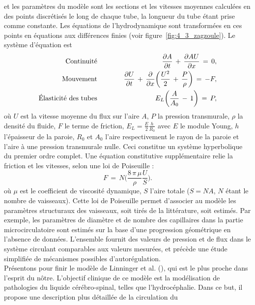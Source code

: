 et les paramètres du modèle sont les sections et les vitesses moyennes calculées en des points
discrétisés le long de chaque tube, la longueur du tube étant prise comme constante. Les équations de l'hydrodynamique sont transformées en ces points en équations aux différences finies (voir figure~\ref{fig:4_3_zagzoule}). Le système
d'équation est
\begin{eqnarray}
 \mbox{Continuité\hspace{1cm}}&&\frac{\partial A}{\partial t}\,+\,\frac{\partial A U}{\partial x}\,=\,0,\\
\mbox{Mouvement\hspace{1cm}}&&\frac{\partial U}{\partial t}\,+\,\frac{\partial}{\partial x} \biggl(\frac{U^2}{2}\,+\,\frac{P}{\rho}\biggr)\,=\,-F,\\
\mbox{\'Elasticité  des tubes\hspace{1cm}}&&E_L\biggl(\frac{A}{A_0}\,-\,1\biggr)\,=\,P,
\end{eqnarray}
où $U$ est la vitesse moyenne du flux sur l'aire $A$, $P$ la pression transmurale, $\rho$ la densité du fluide, $F$ le terme de friction, $E_L=\frac{E}{2}\frac{h}{R_0}$ avec $E$ le module Young, $h$ l'épaisseur de la paroie, $R_0$ et $A_0$ l'aire respectivement le rayon de la paroie et l'aire à une pression transmurale nulle.
 Ceci constitue un système hyperbolique du premier ordre complet. Une équation constitutive
supplémentaire relie la friction et les vitesses, selon une loi de Poiseuille :
\begin{equation}
\label{eq:poiseuille}
F\,=\,N\biggl(\frac{8\,\pi\,\mu}{\rho}\frac{U}{S}\biggr).
\end{equation}
où $\mu$ est le coefficient de viscosité dynamique, $S$ l'aire totale ($S = NA$, $N$ étant le nombre de vaisseaux). Cette loi de Poiseuille permet d'associer au modèle les paramètres structuraux des vaisseaux, soit tirés
de la littérature, soit estimés. Par exemple, les paramètres de diamètre et de nombre des capillaires
dans la partie microcirculatoire sont estimés sur la base d'une progression géométrique en l'absence
de données. L'ensemble fournit des valeurs de pression et de flux dans le système circulant
comparables aux valeurs mesurées, et précède une étude simplifiée de mécanismes possibles
d'autorégulation.\\
Présentons pour finir le modèle de Linninger et al. (\cite{Linninger2009}), qui est le plus proche dans l'esprit du
nôtre. L'objectif clinique de ce modèle est la modélisation de pathologies du liquide cérébro-spinal,
telles que l'hydrocéphalie. Dans ce but, il propose une description plus détaillée de la circulation du
